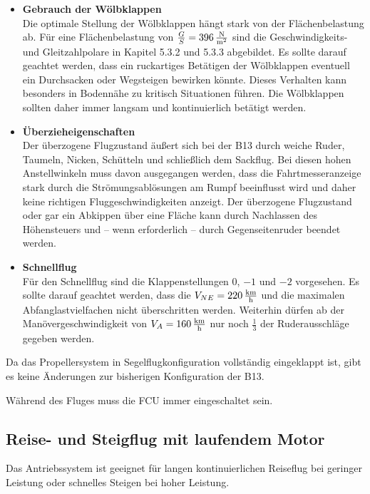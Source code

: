 \begin{itemize}
\item \textbf{Gebrauch der Wölbklappen}\\
Die optimale Stellung der Wölbklappen hängt stark von der Flächenbelastung ab. Für eine Flächenbelastung von $\frac{G}{S}=\unit[396]{\frac{N}{m^2}}$ sind die Geschwindigkeits- und Gleitzahlpolare in Kapitel 5.3.2 und 5.3.3 abgebildet. 
Es sollte darauf geachtet werden, dass ein ruckartiges Betätigen der Wölbklappen eventuell ein Durchsacken oder Wegsteigen bewirken könnte. Dieses Verhalten kann besonders in Bodennähe zu kritisch Situationen führen. Die Wölbklappen sollten daher immer langsam und kontinuierlich betätigt werden. 
\item \textbf{Überzieheigenschaften}\\
Der überzogene Flugzustand äußert sich bei der B13 durch weiche Ruder, Taumeln, Nicken, Schütteln und schließlich dem Sackflug. Bei diesen hohen Anstellwinkeln muss davon ausgegangen werden, dass die Fahrtmesseranzeige stark durch die Strömungsablösungen am Rumpf beeinflusst wird und daher keine richtigen Fluggeschwindigkeiten anzeigt.  Der überzogene Flugzustand oder gar ein Abkippen über eine Fläche kann durch Nachlassen des Höhensteuers und – wenn erforderlich – durch Gegenseitenruder beendet werden. 
\item \textbf{Schnellflug}\\
Für den Schnellflug sind die Klappenstellungen $0$, $-1$ und $-2$ vorgesehen. Es sollte darauf geachtet werden, dass die $V_{NE} = \unit[220]{\frac{km}{h}}$  und die maximalen Abfanglastvielfachen nicht überschritten werden. Weiterhin dürfen ab der Manövergeschwindigkeit von $V_A = \unit[160]{\frac{km}{h}}$ nur noch $\frac{1}{3}$ der Ruderausschläge gegeben werden. 

\end{itemize}

Da das Propellersystem in Segelflugkonfiguration vollständig eingeklappt ist, gibt es keine Änderungen zur bisherigen Konfiguration der B13.

Während des Fluges muss die FCU immer eingeschaltet sein.

\newpage
\subsection{Reise- und Steigflug mit laufendem Motor}
Das Antriebssystem ist geeignet für langen kontinuierlichen Reiseflug bei geringer Leistung oder schnelles Steigen bei hoher Leistung.\\

